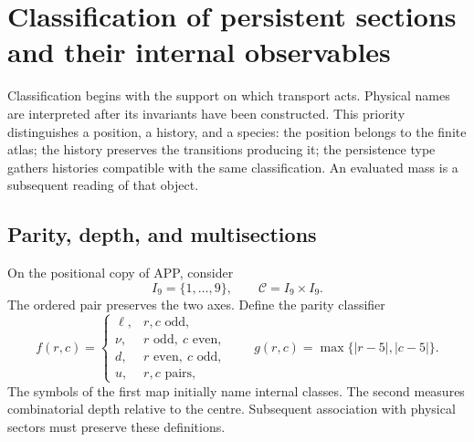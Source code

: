 \section{Classification of persistent sections and their internal observables}
\label{vi:vi:sec:atlas}

Classification begins with the support on which transport acts.
Physical names are interpreted after its invariants have been constructed.
This priority distinguishes a position, a history, and a species:
the position belongs to the finite atlas; the history preserves the transitions
producing it; the persistence type gathers histories compatible with the
same classification. An evaluated mass is a subsequent reading of that object.

\subsection{Parity, depth, and multisections}

On the positional copy of APP, consider
\[
 I_9=\{1,\ldots,9\},\qquad \mathcal C=I_9\times I_9.
\]
The ordered pair preserves the two axes. Define the parity classifier
\[
 f(r,c)=
 \begin{cases}
 \ell,&r,c\text{ odd},\\
 \nu,&r\text{ odd},\ c\text{ even},\\
 d,&r\text{ even},\ c\text{ odd},\\
 u,&r,c\text{ pairs},
 \end{cases}
 \qquad g(r,c)=\max\{|r-5|,|c-5|\}.
\]
The symbols of the first map initially name internal classes.
The second measures combinatorial depth relative to the centre. Subsequent
association with physical sectors must preserve these definitions.


